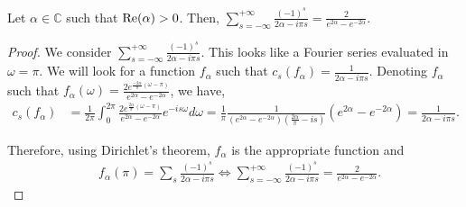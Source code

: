 \begin{lemma}\label{appendix lemma fourier series}
    Let $\alpha\in\mathbb{C}$ such that $\textnormal{Re}(\alpha)>0$. Then,
    \( \displaystyle     \sum_{s=-\infty}^{+\infty}\frac{(-1)^s}{2\alpha - i\pi s} = \frac{2}{e^{2\alpha}-e^{-2\alpha}}.
    \)
\end{lemma}

\begin{proof}
We consider $    \sum_{s=-\infty}^{+\infty}\frac{(-1)^s}{2\alpha - i\pi s}$.
    This looks like a Fourier series evaluated in $\omega=\pi$. We will look for a function $f_\alpha$ such that $c_s(f_\alpha) = \frac{1}{2\alpha -i\pi s}$. Denoting $f_\alpha$ such that $f_\alpha(\omega) = \frac{2e^{\frac{-2\alpha}{\pi}(\omega-\pi)}}{e^{2\alpha}-e^{-2\alpha}}$, we have,
\begin{align*}
    c_s(f_\alpha) &=\frac{1}{2\pi}\int_{0}^{2\pi}\frac{2e^{\frac{2\alpha}{\pi}(\omega-\pi)}}{e^{2\alpha}-e^{-2\alpha}}e^{-is\omega}d\omega=\frac{1}{\pi}\frac{1}{(e^{2\alpha}-e^{-2\alpha})(\frac{2\alpha}{\pi}-is)}(e^{2\alpha}-e^{-2\alpha})=\frac{1}{2\alpha - i\pi s}.
\end{align*}

Therefore, using Dirichlet's theorem, $f_\alpha$ is the appropriate function and
\begin{align*}
   &f_{\alpha}(\pi) = \sum_{s} \frac{(-1)^{s}}{2\alpha -i\pi s}  \Leftrightarrow\sum_{s=-\infty}^{+\infty} \frac{(-1)^{s}}{2\alpha -i\pi s} = \frac{2}{e^{2\alpha}-e^{-2\alpha}}. 
\end{align*}
\end{proof}


